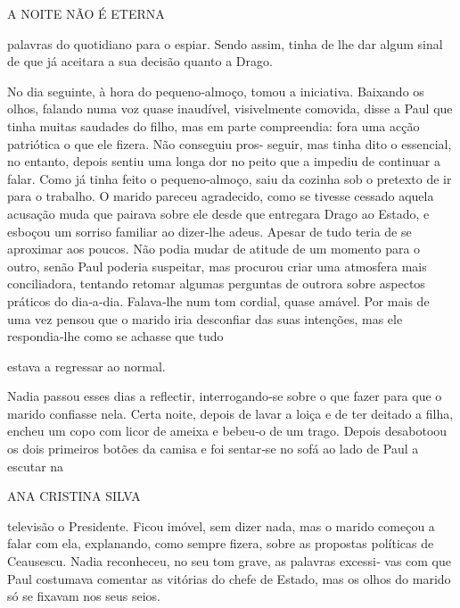 A NOITE NÃO É ETERNA

palavras do quotidiano para o espiar. Sendo assim, tinha de lhe dar
algum sinal de que já aceitara a sua decisão quanto a Drago.

No dia seguinte, à hora do pequeno‑almoço, tomou a iniciativa. Baixando
os olhos, falando numa voz quase inaudível, visivelmente comovida, disse
a Paul que tinha muitas saudades do filho, mas em parte compreendia:
fora uma acção patriótica o que ele fizera. Não conseguiu pros‑ seguir,
mas tinha dito o essencial, no entanto, depois sentiu uma longa dor no
peito que a impediu de continuar a falar. Como já tinha feito o
pequeno‑almoço, saiu da cozinha sob o pretexto de ir para o trabalho. O
marido pareceu agradecido, como se tivesse cessado aquela acusação muda
que pairava sobre ele desde que entregara Drago ao Estado, e esboçou um
sorriso familiar ao dizer‑lhe adeus. Apesar de tudo teria de se
aproximar aos poucos. Não podia mudar de atitude de um momento para o
outro, senão Paul poderia suspeitar, mas procurou criar uma atmosfera
mais conciliadora, tentando retomar algumas perguntas de outrora sobre
aspectos práticos do dia‑a‑dia. Falava‑lhe num tom cordial, quase
amável. Por mais de uma vez pensou que o marido iria desconfiar das suas
intenções, mas ele respondia‑lhe como se achasse que tudo

estava a regressar ao normal.

Nadia passou esses dias a reflectir, interrogando‑se sobre o que fazer
para que o marido confiasse nela. Certa noite, depois de lavar a loiça e
de ter deitado a filha, encheu um copo com licor de ameixa e bebeu‑o de
um trago. Depois desabotoou os dois primeiros botões da camisa e foi
sentar‑se no sofá ao lado de Paul a escutar na

ANA CRISTINA SILVA

televisão o Presidente. Ficou imóvel, sem dizer nada, mas o marido
começou a falar com ela, explanando, como sempre fizera, sobre as
propostas políticas de Ceausescu. Nadia reconheceu, no seu tom grave, as
palavras excessi‑ vas com que Paul costumava comentar as vitórias do
chefe de Estado, mas os olhos do marido só se fixavam nos seus seios.

